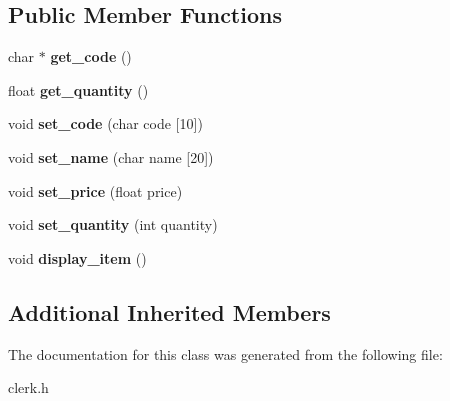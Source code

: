 \subsection*{Public Member Functions}
\begin{DoxyCompactItemize}
\item 
\mbox{\label{classclerk_aecd9f851adba7385510d8f4fd7186c0c}} 
char $\ast$ {\bfseries get\+\_\+code} ()
\item 
\mbox{\label{classclerk_a1e063c286489b9c7a36c2834095bdc27}} 
float {\bfseries get\+\_\+quantity} ()
\item 
\mbox{\label{classclerk_ada10d505eff56232477fb0f8362dac5c}} 
void {\bfseries set\+\_\+code} (char code \mbox{[}10\mbox{]})
\item 
\mbox{\label{classclerk_aa49972c25b70622815b9a858a4a0a071}} 
void {\bfseries set\+\_\+name} (char name \mbox{[}20\mbox{]})
\item 
\mbox{\label{classclerk_a58793e4687bda59dd14c06c6543b4985}} 
void {\bfseries set\+\_\+price} (float price)
\item 
\mbox{\label{classclerk_a0dbebf7f2a33904dd774201e178a288d}} 
void {\bfseries set\+\_\+quantity} (int quantity)
\item 
\mbox{\label{classclerk_a94c493b2cb0239a3ebede01f2b6b2f53}} 
void {\bfseries display\+\_\+item} ()
\end{DoxyCompactItemize}
\subsection*{Additional Inherited Members}


The documentation for this class was generated from the following file\+:\begin{DoxyCompactItemize}
\item 
clerk.\+h\end{DoxyCompactItemize}

